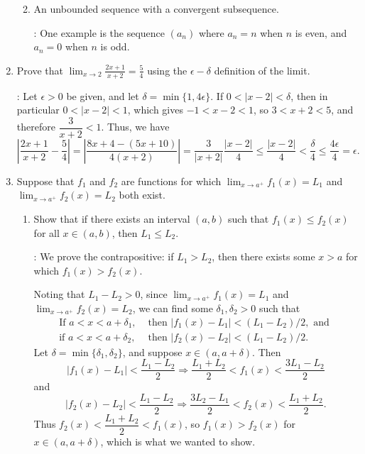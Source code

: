 \documentclass[letterpaper,12pt]{article}
\newcommand{\abs}[1]{\lvert #1\rvert}
\newcommand{\Abs}[1]{\left| #1\right|}
\begin{document}
\begin{enumerate}
\begin{enumerate}
\bigskip

 \item An unbounded sequence with a convergent subsequence.

\bigskip

: One example is the sequence $(a_n)$ where $a_n = n$ when $n$ is even, and $a_n = 0$ when $n$ is odd.

\bigskip

\end{enumerate}
 \item Prove that $\displaystyle \lim_{x\to 2}\frac{2x+1}{x+2} = \frac{5}{4}$ using the $\epsilon-\delta$ definition of the limit.

\bigskip

: Let $\epsilon>0$ be given, and let $\delta = \min\{1,4\epsilon\}$. If $0<\abs{x-2}<\delta$, then in particular $0<\abs{x-2}<1$, which gives $-1<x-2<1$, so $3<x+2<5$, and therefore $\dfrac{3}{x+2}<1$. Thus, we have
\[
 \Abs{\frac{2x+1}{x+2}-\frac{5}{4}} = \Abs{\frac{8x+4-(5x+10)}{4(x+2)}} = \frac{3}{\abs{x+2}}\frac{\abs{x-2}}{4}\leq \frac{\abs{x-2}}{4}<\frac{\delta}{4}\leq \frac{4\epsilon}{4} = \epsilon. 
\]


\bigskip

 \item Suppose that $f_1$ and $f_2$ are functions for which $\lim_{x\to a^+}f_1(x) = L_1$ and $\lim_{x\to a^+}f_2(x) = L_2$ both exist.
\begin{enumerate}
 \item Show that if there exists an interval $(a,b)$ such that $f_1(x)\leq f_2(x)$ for all $x\in (a,b)$, then $L_1\leq L_2$. 

\bigskip

: We prove the contrapositive: if $L_1>L_2$, then there exists some $x>a$ for which $f_1(x)>f_2(x)$.

Noting that $L_1-L_2>0$, since $\lim_{x\to a^+}f_1(x) = L_1$ and $\lim_{x\to a^+}f_2(x) = L_2$, we can find some $\delta_1, \delta_2>0$ such that
\begin{align*}
 \text{If } a<x<a+\delta_1, &\text{ then } \abs{f_1(x)-L_1}<(L_1-L_2)/2, \text{ and }\\
 \text{if } a<x<a+\delta_2, &\text{ then } \abs{f_2(x)-L_2}<(L_1-L_2)/2.
\end{align*}
Let $\delta = \min\{\delta_1,\delta_2\}$, and suppose $x\in(a,a+\delta)$. Then
\[
 \abs{f_1(x)-L_1}<\frac{L_1-L_2}{2} \Rightarrow \frac{L_1+L_2}{2}<f_1(x)<\frac{3L_1-L_2}{2}
\]
and
\[
 \abs{f_2(x)-L_2}<\frac{L_1-L_2}{2} \Rightarrow \frac{3L_2-L_1}{2}<f_2(x)<\frac{L_1+L_2}{2}.
\]
Thus $f_2(x)<\dfrac{L_1+L_2}{2}<f_1(x)$, so $f_1(x)>f_2(x)$ for $x\in(a,a+\delta)$, which is what we wanted to show.


\end{enumerate}
\end{enumerate}
\end{document}
